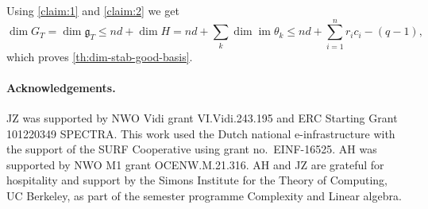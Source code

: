 \documentclass[11pt,a4paper]{article}
\numberwithin{equation}{section}
\DeclareMathOperator{\im}{im}
\begin{document}
Using \cref{claim:1} and \cref{claim:2} we get 
\[
\dim G_T = \dim \mathfrak{g}_T \leq nd + \dim H = nd + \sum_k \dim \im \theta_k \leq nd + \sum_{i=1}^n r_i c_i - (q-1),
\]
which proves \cref{th:dim-stab-good-basis}.

\paragraph{Acknowledgements.} JZ was supported by NWO Vidi grant VI.Vidi.243.195 and ERC Starting Grant 101220349 SPECTRA. This work used the Dutch national e-infrastructure with the support of the SURF Cooperative using grant no.~EINF-16525. AH was supported by NWO M1 grant OCENW.M.21.316. AH and JZ are grateful for hospitality and support by the Simons Institute for the Theory of Computing, UC Berkeley, as part of the semester programme Complexity and Linear algebra.



\end{document}
